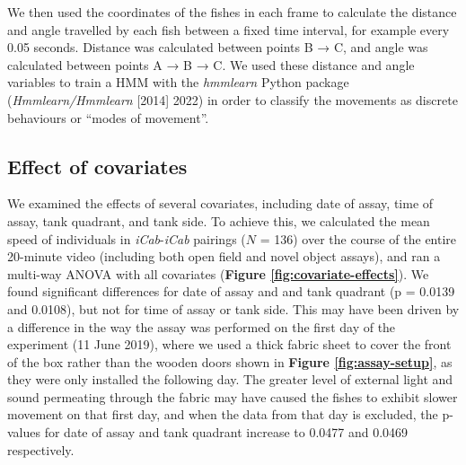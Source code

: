 \documentclass[
]{book}
\begin{document}
We then used the coordinates of the fishes in each frame to calculate the distance and angle travelled by each fish between a fixed time interval, for example every 0.05 seconds. Distance was calculated between points B → C, and angle was calculated between points A → B → C. We used these distance and angle variables to train a HMM with the \emph{hmmlearn} Python package (\emph{Hmmlearn/Hmmlearn} {[}2014{]} 2022) in order to classify the movements as discrete behaviours or ``modes of movement''.

\hypertarget{effect-of-covariates}{%
\subsection{Effect of covariates}\label{effect-of-covariates}}

We examined the effects of several covariates, including date of assay, time of assay, tank quadrant, and tank side. To achieve this, we calculated the mean speed of individuals in \emph{iCab}-\emph{iCab} pairings (\(N\) = 136) over the course of the entire 20-minute video (including both open field and novel object assays), and ran a multi-way ANOVA with all covariates (\textbf{Figure \ref{fig:covariate-effects}}). We found significant differences for date of assay and and tank quadrant (p = 0.0139 and 0.0108), but not for time of assay or tank side. This may have been driven by a difference in the way the assay was performed on the first day of the experiment (11 June 2019), where we used a thick fabric sheet to cover the front of the box rather than the wooden doors shown in \textbf{Figure \ref{fig:assay-setup}}, as they were only installed the following day. The greater level of external light and sound permeating through the fabric may have caused the fishes to exhibit slower movement on that first day, and when the data from that day is excluded, the p-values for date of assay and tank quadrant increase to 0.0477 and 0.0469 respectively.
\end{document}
